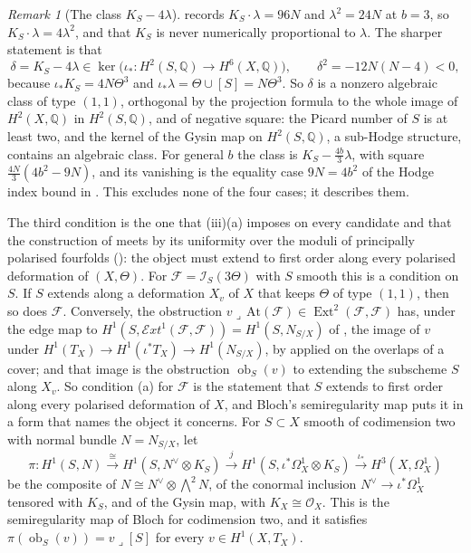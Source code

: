 \documentclass[11pt,reqno]{amsart}
\theoremstyle{plain}
\theoremstyle{definition}
\theoremstyle{remark}
\newtheorem{remark}[theorem]{Remark}
\newcommand{\QQ}{\mathbb{Q}}
\newcommand{\cF}{\mathcal{F}}
\newcommand{\cE}{\mathcal{E}}
\newcommand{\cO}{\mathcal{O}}
\newcommand{\cI}{\mathcal{I}}
\DeclareMathOperator{\Ext}{Ext}
\begin{document}
\begin{remark}[The class $K_{S}-4\lambda$]\label{rem:gysinkernel}
 records $K_{S}\cdot\lambda=96N$ and
$\lambda^{2}=24N$ at $b=3$, so $K_{S}\cdot\lambda=4\lambda^{2}$, and that
$K_{S}$ is never numerically proportional to $\lambda$. The sharper
statement is that
\[
  \delta=K_{S}-4\lambda\in\ker\bigl(\iota_{*}\colon H^{2}(S,\QQ)\to H^{6}(X,\QQ)\bigr),
  \qquad \delta^{2}=-12N(N-4)<0,
\]
because $\iota_{*}K_{S}=4N\Theta^{3}$ and
$\iota_{*}\lambda=\Theta\cup[S]=N\Theta^{3}$. So $\delta$ is a nonzero
algebraic class of type $(1,1)$, orthogonal by the projection formula to the
whole image of $H^{2}(X,\QQ)$ in $H^{2}(S,\QQ)$, and of negative square: the
Picard number of $S$ is at least two, and the kernel of the Gysin map on
$H^{2}(S,\QQ)$, a sub-Hodge structure, contains an algebraic class. For
general $b$ the class is $K_{S}-\tfrac{4b}{3}\lambda$, with square
$\tfrac{4N}{3}(4b^{2}-9N)$, and its vanishing is the equality case $9N=4b^{2}$
of the Hodge index bound in . This excludes none
of the four cases; it describes them.
\end{remark}

The third condition is the one that (iii)(a) imposes on
every candidate and that the construction of  meets by
its uniformity over the moduli of principally polarised fourfolds
(): the object must extend to first order along
every polarised deformation of $(X,\Theta)$. For $\cF=\cI_{S}(3\Theta)$ with
$S$ smooth this is a condition on $S$. If $S$ extends along a deformation
$X_{v}$ of $X$ that keeps $\Theta$ of type $(1,1)$, then so does $\cF$.
Conversely, the obstruction $v\lrcorner\,\mathrm{At}(\cF)\in\Ext^{2}(\cF,\cF)$
has, under the edge map to $H^{1}(S,\cE xt^{1}(\cF,\cF))=H^{1}(S,N_{S/X})$ of
, the image of $v$ under
$H^{1}(T_{X})\to H^{1}(\iota^{*}T_{X})\to H^{1}(N_{S/X})$, by
 applied on the overlaps of a cover; and that image is the
obstruction $\operatorname{ob}_{S}(v)$ to extending the subscheme $S$ along
$X_{v}$. So condition (a) for $\cF$ is the statement that $S$ extends to
first order along every polarised deformation of $X$, and Bloch's
semiregularity map \cite{Blo72} puts it in a form that names the object it
concerns. For $S\subset X$ smooth of codimension two with normal bundle
$N=N_{S/X}$, let
\[
  \pi\colon H^{1}(S,N)\xrightarrow{\ \cong\ }H^{1}(S,N^{\vee}\otimes K_{S})
  \xrightarrow{\ j\ }H^{1}(S,\iota^{*}\Omega^{1}_{X}\otimes K_{S})
  \xrightarrow{\ \iota_{*}\ }H^{3}(X,\Omega^{1}_{X})
\]
be the composite of $N\cong N^{\vee}\otimes\bigwedge^{2}N$, of the conormal
inclusion $N^{\vee}\to\iota^{*}\Omega^{1}_{X}$ tensored with $K_{S}$, and of
the Gysin map, with $K_{X}\cong\cO_{X}$. This is the semiregularity map of
Bloch for codimension two, and it satisfies
$\pi(\operatorname{ob}_{S}(v))=v\lrcorner[S]$ for every $v\in H^{1}(X,T_{X})$.
\end{document}
